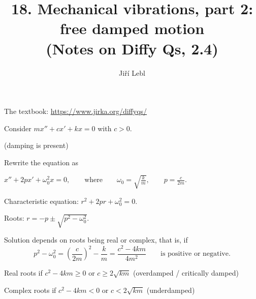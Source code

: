\documentclass[10pt,aspectratio=169]{beamer}
\author{Ji\v{r}\'i Lebl}
\institute[OSU]{%
Oklahoma State University%
}
\title{18. Mechanical vibrations, part 2: free damped motion\\(Notes on Diffy Qs, 2.4)}
\date{}
\begin{document}
\begin{frame}
\titlepage


\begin{center}
The textbook: \url{https://www.jirka.org/diffyqs/}
\end{center}
\end{frame}

\begin{frame}
\hfill{}

\vspace*{-0.8in}

Consider 
\quad
$m x'' + c x' + kx = 0$
\quad
with $c > 0$.

(damping is present)

\medskip
\pause

Rewrite the equation as

\medskip

\qquad
$\displaystyle
x'' + 2p x' + \omega_0^2 x = 0,
\qquad
\text{where}
\qquad
\omega_0 = \sqrt{\frac{k}{m}}, \qquad p = \frac{c}{2m} .
$

\pause
\medskip

Characteristic equation:
\quad $r^2 + 2 pr + \omega_0^2 = 0$.

\pause
\medskip

Roots:
\quad $r = -p \pm \sqrt{p^2 - \omega_0^2}$.

\medskip
\pause

Solution depends on roots being real or complex, that is, if
\[
p^2 - \omega_0^2 = {\left( \frac{c}{2m} \right)}^2 - \frac{k}{m}
= \frac{c^2 - 4km}{4m^2}
\qquad
\text{is positive or negative.}
\]

\medskip
\pause

Real roots if \quad $c^2 - 4km \geq 0$ \quad or \quad $c \geq 2\sqrt{km}$ \quad
(overdamped / critically damped)

\medskip
\pause

Complex roots if \quad $c^2 - 4km < 0$ \quad or \quad $c < 2\sqrt{km}$ \quad
(underdamped)

\end{frame}
\end{document}
